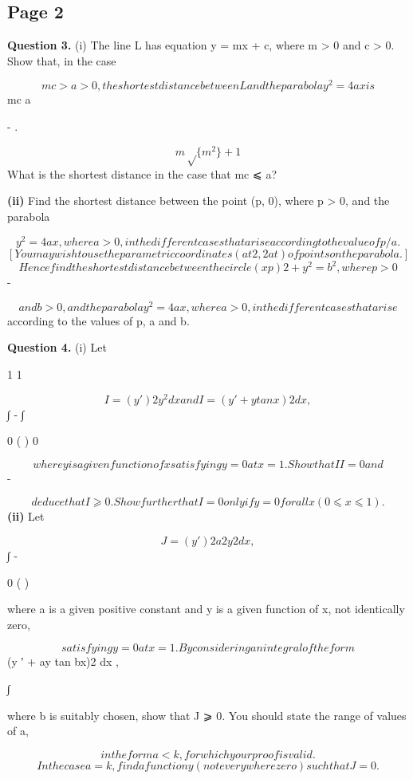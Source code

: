 \documentclass[12pt]{article}
\begin{document}
\subsection*{Page 2}
\begin{flushleft}
\bigskip\textbf{Question 3.} (i) The line L has equation y = mx + c, where m > 0 and c > 0. Show that, in the case\par
\[mc > a > 0, the shortest distance between L and the parabola y^2 = 4ax is\]
mc a\par
- .\par
\[m\sqrt\{m^2\} + 1\]
What is the shortest distance in the case that mc ⩽ a?\par
\textbf{(ii)} Find the shortest distance between the point (p, 0), where p > 0, and the parabola\par
\[y^2 = 4ax, where a > 0, in the different cases that arise according to the value of p/a.\]
\[[You may wish to use the parametric coordinates (at2, 2at) of points on the parabola.]\]
\[Hence find the shortest distance between the circle (x p)2 + y^2 = b^2, where p > 0\]
-\par
\[and b > 0, and the parabola y^2 = 4ax, where a > 0, in the different cases that arise\]
according to the values of p, a and b.\par
\bigskip\textbf{Question 4.} (i) Let\par
1 1\par
\[I = (y ′ )2 y^2 dx and I = (y ′ + y tan x)2 dx ,\]
∫ - ∫\par
0 ( ) 0\par
\[where y is a given function of x satisfying y = 0 at x = 1. Show that I I = 0 and\]
-\par
\[deduce that I ⩾ 0. Show further that I = 0 only if y = 0 for all x (0 ⩽ x ⩽ 1).\]
\textbf{(ii)} Let\par
\[J = (y ′ )2 a2y2 dx ,\]
∫ -\par
0 ( )\par
where a is a given positive constant and y is a given function of x, not identically zero,\par
\[satisfying y = 0 at x = 1. By considering an integral of the form\]
(y ′ + ay tan bx)2 dx ,\par
∫\par
where b is suitably chosen, show that J ⩾ 0. You should state the range of values of a,\par
\[in the form a < k, for which your proof is valid.\]
\[In the case a = k, find a function y (not everywhere zero) such that J = 0.\]
\end{flushleft}
\end{document}
